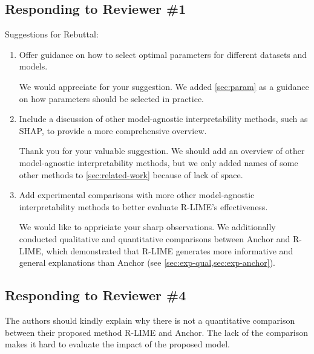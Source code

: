 \documentclass[runningheads]{llncs}
\begin{document}
\subsection*{Responding to Reviewer \#1}
Suggestions for Rebuttal:
\begin{enumerate}
  \setlength{\itemsep}{15pt}
  \item Offer guidance on how to select optimal parameters for different
        datasets and models.

        \begin{mycomment}
          We would appreciate for your suggestion.
          We added \cref{sec:param} as a guidance on how parameters should be
          selected in practice.
        \end{mycomment}

  \item Include a discussion of other model-agnostic interpretability methods,
        such as SHAP, to provide a more comprehensive overview.

        \begin{mycomment}
          Thank you for your valuable suggestion.
          We should add an overview of other model-agnostic interpretability
          methods, but we only added names of some other methods to
          \cref{sec:related-work} because of lack of space.
        \end{mycomment}

  \item Add experimental comparisons with more other model-agnostic \\
        interpretability methods to better evaluate R-LIME's effectiveness.

        \begin{mycomment}
          We would like to appriciate your sharp observations.
          We additionally conducted qualitative and quantitative comparisons
          between Anchor and R-LIME,
          which demonstrated that R-LIME generates more informative and
          general explanations than Anchor (see \cref{sec:exp-qual,sec:exp-anchor}).
        \end{mycomment}
\end{enumerate}
\subsection*{Responding to Reviewer \#4}
The authors should kindly explain why there is not a quantitative comparison
between their proposed method R-LIME and Anchor. The lack of the comparison
makes it hard to evaluate the impact of the proposed model.
\end{document}
